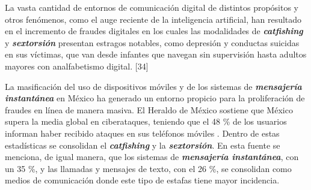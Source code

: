 La vasta cantidad de entornos de comunicación digital de distintos propósitos y otros fenómenos, como el auge reciente de la inteligencia artificial, han resultado en el incremento de fraudes digitales en los cuales las modalidades de \textbf{\textit{catfishing}} y \textbf{\textit{sextorsión}} presentan estragos notables, como depresión y conductas suicidas en sus víctimas, que van desde infantes que navegan sin supervisión hasta adultos mayores con analfabetismo digital. [34]

La masificación del uso de dispositivos móviles y de los sistemas de \textbf{\textit{mensajería instantánea}} en México ha generado un entorno propicio para la proliferación de fraudes en línea de manera masiva. El Heraldo de México sostiene que México supera la media global en ciberataques, teniendo que el 48 \% de los usuarios informan haber recibido ataques en sus teléfonos móviles \cite{heraldo1youtube}. Dentro de estas estadísticas se consolidan el \textbf{\textit{catfishing}} y la \textbf{\textit{sextorsión}}. En esta fuente se menciona, de igual manera, que los sistemas de \textbf{\textit{mensajería instantánea}}, con un 35 \%, y las llamadas y mensajes de texto, con el 26 \%, se consolidan como medios de comunicación donde este tipo de estafas tiene mayor incidencia.








